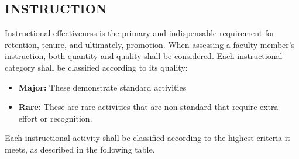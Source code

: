 \documentclass{scrartcl}
\begin{document}
\subsection{INSTRUCTION}
Instructional effectiveness is the primary and indispensable requirement for retention, tenure, and ultimately, promotion. When assessing a faculty member’s instruction, both quantity and quality shall be considered. Each instructional category shall be classified according to its quality:
\begin{itemize}
\item \textbf{Major:} These demonstrate standard activities
\item \textbf{Rare:} These are rare activities that are non-standard that require extra effort or recognition.
\end{itemize}
Each instructional activity shall be classified according to the highest criteria it meets, as described in the following table.
\end{document}
